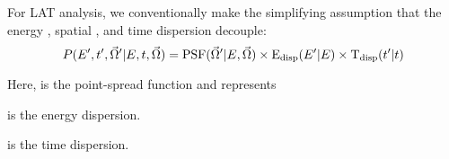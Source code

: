 For LAT analysis, we conventionally make the simplifying assumption that
the energy , spatial , and time dispersion decouple:
\begin{equation}
  P(E',t',\vec\Omega'|E,t,\vec\Omega) = 
  \text{PSF}(\vec\Omega'|E,\vec\Omega) \times \text{E}_\text{disp}(E'|E) \times \text{T}_\text{disp}(t'|t)
\end{equation}

Here, \psf is the point-spread function and represents 

\edisp is the energy dispersion. 

\tdisp is the time dispersion. 

